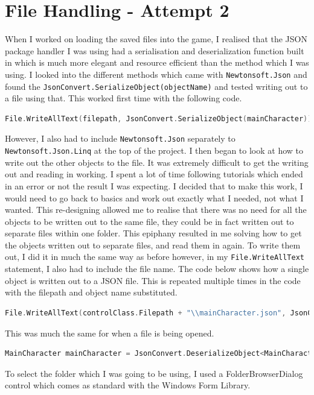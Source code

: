 \section{File Handling - Attempt 2}
When I worked on loading the saved files into the game, I realised that the JSON package handler I was using had a serialisation and deserialization function built in which is much more elegant and resource efficient than the method which I was using. I looked into the different methods which came with \verb|Newtonsoft.Json| and found the \verb|JsonConvert.SerializeObject(objectName)| and tested writing out to a file using that. This worked first time with the following code.
\begin{lstlisting}[language=c, style=csharp, caption=Code used to write out to JSON files]
File.WriteAllText(filepath, JsonConvert.SerializeObject(mainCharacter));
\end{lstlisting}
However, I also had to include \verb|Newtonsoft.Json| separately to \verb|Newtonsoft.Json.Linq| at the top of the project. I then began to look at how to write out the other objects to the file.
It was extremely difficult to get the writing out and reading in working. I spent a lot of time following tutorials which ended in an error or not the result I was expecting. I decided that to make this work, I would need to go back to basics and work out exactly what I needed, not what I wanted. This re-designing allowed me to realise that there was no need for all the objects to be written out to the same file, they could be in fact written out to separate files within one folder. This epiphany resulted in me solving how to get the objects written out to separate files, and read them in again. To write them out, I did it in much the same way as before however, in my \verb|File.WriteAllText| statement, I also had to include the file name. The code below shows how a single object is written out to a JSON file. This is repeated multiple times in the code with the filepath and object name substituted.
\begin{lstlisting}[language=c, style=csharp, caption=Code used to write out to JSON files]
File.WriteAllText(controlClass.Filepath + "\\mainCharacter.json", JsonConvert.SerializeObject(mainCharacter));
\end{lstlisting}
This was much the same for when a file is being opened.
\begin{lstlisting}[language=c, style=csharp, caption=Code used to open a JSON file and read the contents of it into an object]
MainCharacter mainCharacter = JsonConvert.DeserializeObject<MainCharacter>(File.ReadAllText(loadFilepath + "\\mainCharacter.json"));
\end{lstlisting}
To select the folder which I was going to be using, I used a FolderBrowserDialog control which comes as standard with the Windows Form Library.

